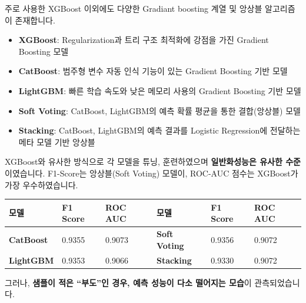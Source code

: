 \documentclass[
  a4paper,
  DIV=11,
  numbers=noendperiod]{scrreprt}
\providecommand{\tightlist}{%
  \setlength{\itemsep}{0pt}\setlength{\parskip}{0pt}}\usepackage{longtable,booktabs,array}
\begin{document}
\begin{tcolorbox}[enhanced jigsaw, bottomtitle=1mm, breakable, coltitle=black, opacityback=0, titlerule=0mm, left=2mm, colbacktitle=quarto-callout-note-color!10!white, toptitle=1mm, colframe=quarto-callout-note-color-frame, bottomrule=.15mm, opacitybacktitle=0.6, leftrule=.75mm, title=\textcolor{quarto-callout-note-color}{\faInfo}\hspace{0.5em}{여러 Gradiant boosting 계열의 알고리즘과 비교}, arc=.35mm, toprule=.15mm, rightrule=.15mm, colback=white]

주로 사용한 XGBoost 이외에도 다양한 Gradiant boosting 계열 및 앙상블
알고리즘이 존재합니다.

\begin{itemize}
\tightlist
\item
  \textbf{XGBoost}: Regularization과 트리 구조 최적화에 강점을 가진
  Gradient Boosting 모델 \textbar{}
\item
  \textbf{CatBoost}: 범주형 변수 자동 인식 기능이 있는 Gradient Boosting
  기반 모델
\item
  \textbf{LightGBM}: 빠른 학습 속도와 낮은 메모리 사용의 Gradient
  Boosting 기반 모델
\item
  \textbf{Soft Voting}: CatBoost, LightGBM의 예측 확률 평균을 통한
  결합(앙상블) 모델
\item
  \textbf{Stacking}: CatBoost, LightGBM의 예측 결과를 Logistic
  Regression에 전달하는 메타 모델 기반 앙상블
\end{itemize}

XGBoost와 유사한 방식으로 각 모델을 튜닝, 훈련하였으며
\textbf{일반화성능은 유사한 수준}이였습니다. F1-Score는 앙상블(Soft
Voting) 모델이, ROC-AUC 점수는 XGBoost가 가장 우수하였습니다.

\begin{longtable}[]{@{}llllll@{}}
\toprule\noalign{}
모델 & F1 Score & ROC AUC & 모델 & F1 Score & ROC AUC \\
\midrule\noalign{}
\endhead
\bottomrule\noalign{}
\endlastfoot
\textbf{CatBoost} & 0.9355 & 0.9073 & \textbf{Soft Voting} & 0.9356 &
0.9072 \\
\textbf{LightGBM} & 0.9353 & 0.9066 & \textbf{Stacking} & 0.9330 &
0.9072 \\
\end{longtable}

\end{tcolorbox}

그러나, \textbf{샘플이 적은 ``부도''인 경우, 예측 성능이 다소 떨어지는
모습}이 관측되었습니다.
\end{document}
